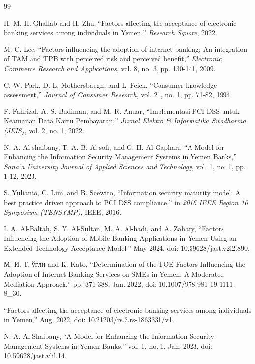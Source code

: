 \documentclass[12pt,a4paper,oneside]{report}
\begin{document}
	\begin{thebibliography}{99}
		
		H. M. H. Ghallab and H. Zhu, ``Factors affecting the acceptance of electronic banking services among individuals in Yemen,'' \textit{Research Square}, 2022.
		
		M. C. Lee, ``Factors influencing the adoption of internet banking: An integration of TAM and TPB with perceived risk and perceived benefit,'' \textit{Electronic Commerce Research and Applications}, vol. 8, no. 3, pp. 130-141, 2009.
		
		C. W. Park, D. L. Mothersbaugh, and L. Feick, ``Consumer knowledge assessment,'' \textit{Journal of Consumer Research}, vol. 21, no. 1, pp. 71-82, 1994.
		
		F. Fahrizal, A. S. Budiman, and M. R. Anuar, ``Implementasi PCI-DSS untuk Keamanan Data Kartu Pembayaran,'' \textit{Jurnal Elektro \& Informatika Swadharma (JEIS)}, vol. 2, no. 1, 2022.
		
		N. A. Al-shaibany, T. A. B. Al-sofi, and G. H. Al Gaphari, ``A Model for Enhancing the Information Security Management Systems in Yemen Banks,'' \textit{Sana'a University Journal of Applied Sciences and Technology}, vol. 1, no. 1, pp. 1-12, 2023.
		
		S. Yulianto, C. Lim, and B. Soewito, ``Information security maturity model: A best practice driven approach to PCI DSS compliance,'' in \textit{2016 IEEE Region 10 Symposium (TENSYMP)}, IEEE, 2016.
		
		I. A. Al-Baltah, S. Y. Al-Sultan, M. A. Al-hadi, and A. Zahary, ``Factors Influencing the Adoption of Mobile Banking Applications in Yemen Using an Extended Technology Acceptance Model,'' May 2024, doi: 10.59628/jast.v2i2.890.
		
		М. И. Т. ўғли and K. Kato, ``Determination of the TOE Factors Influencing the Adoption of Internet Banking Services on SMEs in Yemen: A Moderated Mediation Approach,'' pp. 371-388, Jan. 2022, doi: 10.1007/978-981-19-1111-8\_30.
		
		``Factors affecting the acceptance of electronic banking services among individuals in Yemen,'' Aug. 2022, doi: 10.21203/rs.3.rs-1863331/v1.
		
		N. A. Al-Shaibany, ``A Model for Enhancing the Information Security Management Systems in Yemen Banks,'' vol. 1, no. 1, Jan. 2023, doi: 10.59628/jast.vlil.14.
		

\end{thebibliography}
\end{document}
